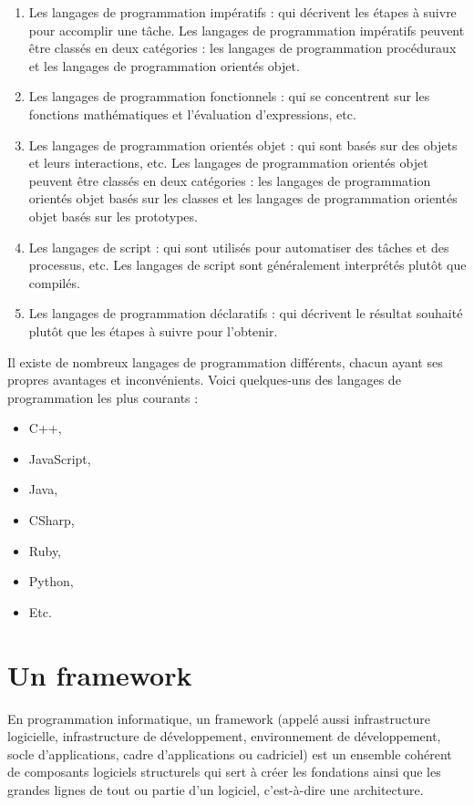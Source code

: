 \begin{enumerate}
    \item Les langages de programmation impératifs : qui décrivent les étapes à suivre pour
    accomplir une tâche. Les langages de programmation impératifs peuvent être classés en
    deux catégories : les langages de programmation procéduraux et les langages de programmation
    orientés objet.
    \item Les langages de programmation fonctionnels : qui se concentrent sur les fonctions
    mathématiques et l'évaluation d'expressions, etc.
    \item Les langages de programmation orientés objet : qui sont basés sur des objets et
    leurs interactions,  etc. Les langages de programmation orientés objet peuvent être classés
    en deux catégories : les langages de programmation orientés objet basés sur les classes et
    les langages de programmation orientés objet basés sur les prototypes.
    \item Les langages de script : qui sont utilisés pour automatiser des tâches et des processus, etc.
    Les langages de script sont généralement interprétés plutôt que compilés.
    \item Les langages de programmation déclaratifs : qui décrivent le résultat souhaité plutôt que
    les étapes à suivre pour l'obtenir.
\end{enumerate}

Il existe de nombreux langages de programmation différents, chacun ayant ses propres avantages et
inconvénients. Voici quelques-uns des langages de programmation les plus courants :
\begin{itemize}
    \item C++,
    \item JavaScript,
    \item Java,
    \item CSharp,
    \item Ruby,
    \item Python,
    \item Etc.
\end{itemize}

\section{Un framework}\label{sec:framework}
En programmation informatique, un framework\cite{framework} (appelé aussi infrastructure logicielle,
infrastructure de développement, environnement de développement, socle d'applications,
cadre d'applications ou cadriciel) est un ensemble cohérent de composants logiciels
structurels qui sert à créer les fondations ainsi que les grandes lignes de tout ou partie
d'un logiciel, c'est-à-dire une architecture.

